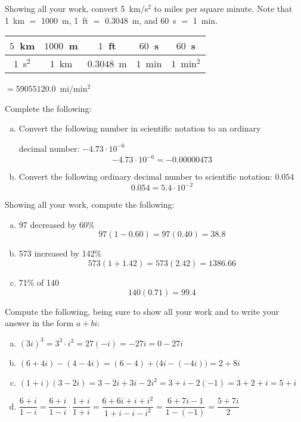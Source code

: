 \documentclass[12pt,letterpaper]{exam}
\begin{document}
\begin{questions}
\newpage



\question[8] Showing all your work, convert 5~km/s$^2$ to miles per square minute. Note that 1~km $=$ 1000~m, 1~ft $=$ 0.3048~m, and 60~s $=$ 1~min.

	\begin{table}[!ht]
	\centering
	\begin{tabular}{c|c|c|c|c}
	$5$~km & $1000$~m & $1$~ft & $60$~s & $60$~s \\ \hline
	$1$~s$^2$ & $1$~km & $0.3048$~m & $1$~min & $1$~min$^2$
	\end{tabular}
	$= 59055120.0$~mi/min$^2$
	\end{table}



\newpage



\question[4] Complete the following:
	\begin{enumerate}[(a)]
	\item Convert the following number in scientific notation to an ordinary \par decimal number: $-4.73 \cdot 10^{-6}$ \pspace
		\[
		-4.73 \cdot 10^{-6}= -0.00000473
		\] \pvspace{0.85cm}
	\item Convert the following ordinary decimal number to scientific notation: $0.054$ \pspace
		\[
		0.054= 5.4 \cdot 10^{-2}
		\] \pvspace{0.85cm}
	\end{enumerate} \vfill

\question[8] Showing all your work, compute the following: \pspace
        \begin{enumerate}[(a)]
        \item 97 decreased by 60\% \pspace
		\[
		97 (1 - 0.60)= 97(0.40)= 38.8
		\] \pvspace{0.85cm}
	
        \item 573 increased by 142\% \pspace
		\[
		573 (1 + 1.42)= 573(2.42)= 1386.66
		\] \pvspace{0.85cm}
	
        \item 71\% of 140 \pspace
		\[
		140 (0.71)= 99.4 
		\] \pvspace{0.9cm}
        \end{enumerate}



\newpage



\question[8] Compute the following, being sure to show all your work and to write your answer in the form $a + bi$: \pspace
	\begin{enumerate}[(a)]
	\item $(3i)^3= 3^3 \cdot i^3= 27(-i)= -27i= 0 - 27i$ \vfill
	\item $(6 + 4i) - (4 - 4i)= (6 - 4) + \big(4i - (-4i) \big)= 2 + 8i$ \vfill
	\item $(1 + i)(3 - 2i)= 3 - 2i + 3i - 2i^2= 3 + i - 2(-1)= 3 + 2 + i= 5 + i$ \vfill
	\item $\dfrac{6 + i}{1 - i}= \dfrac{6 + i}{1 - i} \cdot \dfrac{1 + i}{1 + i}= \dfrac{6 + 6i + i + i^2}{1 + i - i - i^2}= \dfrac{6 + 7i - 1}{1 - (-1)}= \dfrac{5 + 7i}{2}$ \vfill
	\end{enumerate}




\end{questions}
\end{document}
